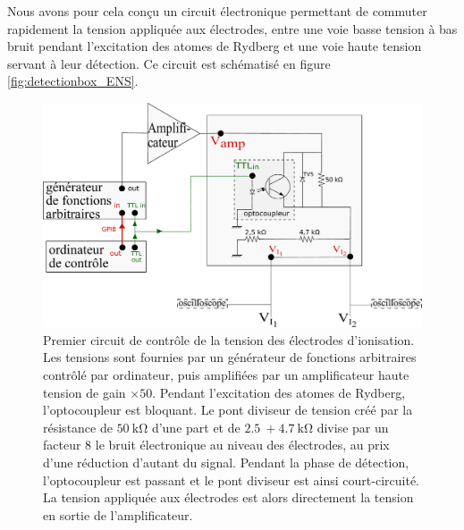 Nous avons pour cela conçu un circuit électronique permettant de commuter rapidement la tension appliquée aux électrodes, entre une voie basse tension à bas bruit pendant l'excitation des atomes de Rydberg et une voie haute tension servant à leur détection.
Ce circuit est schématisé en figure \eqref{fig:detectionbox_ENS}.
%
\begin{figure}[!h]
\centering
\includegraphics[width=.8\linewidth]{figures/setup/rydberg/detectionbox_ENS}
\caption[Premier circuit de contrôle de la tension des électrodes d'ionisation]{
Premier circuit de contrôle de la tension des électrodes d'ionisation.
Les tensions sont fournies par un générateur de fonctions arbitraires contrôlé par ordinateur, puis amplifiées par un amplificateur haute tension de gain $\times \num{50}$.
Pendant l'excitation des atomes de Rydberg, l'optocoupleur est bloquant.
Le pont diviseur de tension créé par la résistance de $\SI{50}{\kilo\ohm}$ d'une part et de $\SI{2.5}{} + \SI{4.7}{\kilo\ohm}$ divise par un facteur $\num{8}$ le bruit électronique au niveau des électrodes, au prix d'une réduction d'autant du signal.
Pendant la phase de détection, l'optocoupleur est passant et le pont diviseur est ainsi court-circuité.
La tension appliquée aux électrodes est alors directement la tension en sortie de l'amplificateur.
}
\label{fig:detectionbox_ENS}
\end{figure}
%


